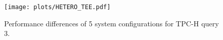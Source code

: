 \begin{figure}[ht]
	\centering
	\texttt{[image: plots/HETERO\_TEE.pdf]}
	\caption{\label{fig:end-end-eval} Performance differences of 5 system configurations for TPC-H query 3.}
\end{figure}